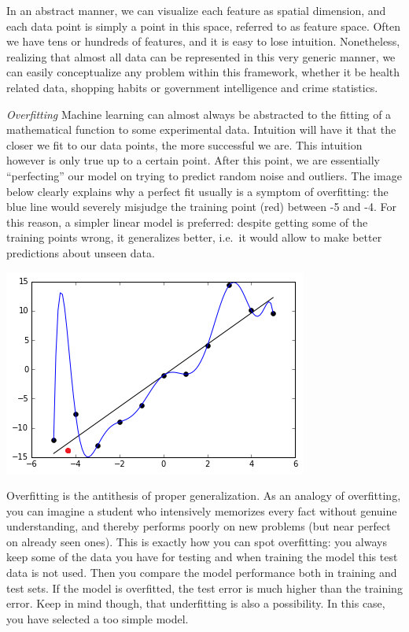 \documentclass[
]{book}
\begin{document}
In an abstract manner, we can visualize each feature as spatial dimension, and each data point is simply a point in this space, referred to as feature space. Often we have tens or hundreds of features, and it is easy to lose intuition. Nonetheless, realizing that almost all data can be represented in this very generic manner, we can easily conceptualize any problem within this framework, whether it be health related data, shopping habits or government intelligence and crime statistics.

\emph{Overfitting}
Machine learning can almost always be abstracted to the fitting of a mathematical function to some experimental data. Intuition will have it that the closer we fit to our data points, the more successful we are. This intuition however is only true up to a certain point. After this point, we are essentially ``perfecting'' our model on trying to predict random noise and outliers. The image below clearly explains why a perfect fit usually is a symptom of overfitting: the blue line would severely misjudge the training point (red) between -5 and -4. For this reason, a simpler linear model is preferred: despite getting some of the training points wrong, it generalizes better, i.e.~it would allow to make better predictions about unseen data.

\includegraphics{assets/Overfitted_Data_Ghiles_CCBYSA4_0.png}

Overfitting is the antithesis of proper generalization. As an analogy of overfitting, you can imagine a student who intensively memorizes every fact without genuine understanding, and thereby performs poorly on new problems (but near perfect on already seen ones). This is exactly how you can spot overfitting: you always keep some of the data you have for testing and when training the model this test data is not used. Then you compare the model performance both in training and test sets. If the model is overfitted, the test error is much higher than the training error. Keep in mind though, that underfitting is also a possibility. In this case, you have selected a too simple model.
\end{document}
